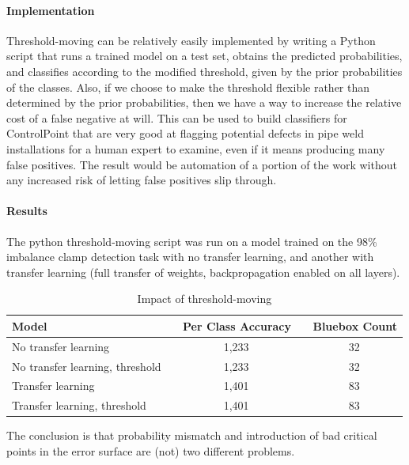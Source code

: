 \documentclass[a4paper,11pt]{article}
\begin{document}
\paragraph{Implementation}
Threshold-moving can be relatively easily implemented by writing a Python script that runs a trained model on a test set, obtains the predicted probabilities, and classifies according to the modified threshold, given by the prior probabilities of the classes. Also, if we choose to make the threshold flexible rather than determined by the prior probabilities, then we have a way to increase the relative cost of a false negative at will. This can be used to build classifiers for ControlPoint that are very good at flagging potential defects in pipe weld installations for a human expert to examine, even if it means producing many false positives. The result would be automation of a portion of the work without any increased risk of letting false positives slip through. \\

\paragraph{Results}
The python threshold-moving script was run on a model trained on the 98\% imbalance clamp detection task with no transfer learning, and another with transfer learning (full transfer of weights, backpropagation enabled on all layers). 

\begin{table}[h!]
   \centering
    \begin{tabular}{|l|c|c|}
    \hline
    Model                            & ~ Per Class Accuracy  & ~ Bluebox Count  \\ 
    \hline
    No transfer learning             & ~  1,233        & ~ 32      \\
    No transfer learning, threshold  & ~  1,233        & ~ 32      \\
    \hline
    Transfer learning                & ~ 1,401         & ~ 83      \\
    Transfer learning, threshold     & ~ 1,401         & ~ 83      \\
    \hline
    \end{tabular}
    \caption {Impact of threshold-moving}
\end{table} 

The conclusion is that probability mismatch and introduction of bad critical points in the error surface are (not) two different problems.
\end{document}
